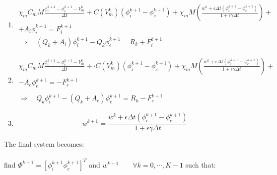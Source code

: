 \documentclass[a4paper,11pt]{article}
\begin{document}
\begin{enumerate}
\item
\begin{equation*}
\begin{gathered}
\chi_m C_m M \frac{	\phi_i^{k+1}-\phi_e^{k+1}-V_m^{k}}{\Delta t} +  C(V_m^k) (\phi_i^{k+1}-\phi_e^{k+1}) + \chi_m M \left(\frac{w^k + \epsilon \Delta t (\phi_i^{k+1}-\phi_e^{k+1})}{1+\epsilon \gamma \Delta t}   \right)+\\
+ A_i \phi_i ^{k+1} = F_i^{k+1} \\
\Rightarrow \quad (Q_k + A_i) \phi_i^{k+1} - Q_k \phi_e^{k+1} =R_k +  F_i^{k+1}
\end{gathered}
\end{equation*}
\item
\begin{equation*}
\begin{gathered}
\chi_m C_m M \frac{	\phi_i^{k+1}-\phi_e^{k+1}-V_m^{k}}{\Delta t} + \cdot C(V_m^k) (\phi_i^{k+1}-\phi_e^{k+1}) + \chi_m M \left(\frac{w^k + \epsilon \Delta t (\phi_i^{k+1}-\phi_e^{k+1})}{1+\epsilon \gamma \Delta t}   \right) +\\
- A_e \phi_e ^{k+1} = -F_e^{k+1} \\ \\
\Rightarrow \quad Q_k \phi_i^{k+1} - (Q_k+A_e) \phi_e^{k+1} =R_k - F_e^{k+1}
\end{gathered}
\end{equation*}
\item 
\begin{equation*}
w^{k+1} = \frac{w^k + \epsilon \Delta t (\phi_i^{k+1}-\phi_e^{k+1})}{1+\epsilon \gamma \Delta t}
\end{equation*}
\end{enumerate}
\vspace{4mm}
The final system becomes:\\ \\
find $\Phi^{k+1}=[\phi_i^{k+1} \phi_e^{k+1}]^T$ and $w^{k+1} \qquad \forall k=0, \cdots, K-1$ such that:
\end{document}
